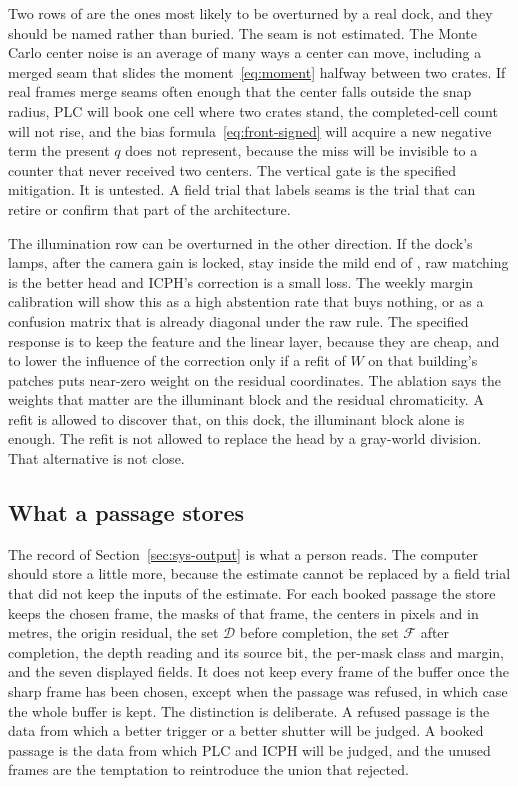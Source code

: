 Two rows of  are the ones most likely to be overturned by a real dock, and they should be named rather than buried. The seam is not estimated. The Monte Carlo center noise is an average of many ways a center can move, including a merged seam that slides the moment~\eqref{eq:moment} halfway between two crates. If real frames merge seams often enough that the center falls outside the snap radius, PLC will book one cell where two crates stand, the completed-cell count will not rise, and the bias formula~\eqref{eq:front-signed} will acquire a new negative term the present $q$ does not represent, because the miss will be invisible to a counter that never received two centers. The vertical gate is the specified mitigation. It is untested. A field trial that labels seams is the trial that can retire or confirm that part of the architecture.

The illumination row can be overturned in the other direction. If the dock's lamps, after the camera gain is locked, stay inside the mild end of , raw matching is the better head and ICPH's correction is a small loss. The weekly margin calibration will show this as a high abstention rate that buys nothing, or as a confusion matrix that is already diagonal under the raw rule. The specified response is to keep the feature and the linear layer, because they are cheap, and to lower the influence of the correction only if a refit of $W$ on that building's patches puts near-zero weight on the residual coordinates. The ablation says the weights that matter are the illuminant block and the residual chromaticity. A refit is allowed to discover that, on this dock, the illuminant block alone is enough. The refit is not allowed to replace the head by a gray-world division. That alternative is not close.

\subsection{What a passage stores}
\label{sec:stores}

The record of Section~\ref{sec:sys-output} is what a person reads. The computer should store a little more, because the estimate cannot be replaced by a field trial that did not keep the inputs of the estimate. For each booked passage the store keeps the chosen frame, the masks of that frame, the centers in pixels and in metres, the origin residual, the set $\mathcal{D}$ before completion, the set $\mathcal{F}$ after completion, the depth reading and its source bit, the per-mask class and margin, and the seven displayed fields. It does not keep every frame of the buffer once the sharp frame has been chosen, except when the passage was refused, in which case the whole buffer is kept. The distinction is deliberate. A refused passage is the data from which a better trigger or a better shutter will be judged. A booked passage is the data from which PLC and ICPH will be judged, and the unused frames are the temptation to reintroduce the union that  rejected.

